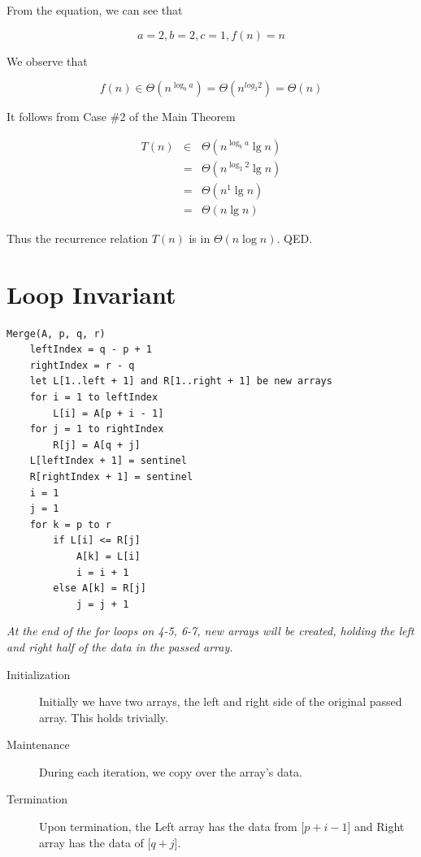 \documentclass{article}
\begin{document}
From the equation, we can see that

\begin{equation}
a = 2, b = 2, c = 1, f(n) = n
\end{equation}

We observe that

\begin{equation}
f(n) \in \Theta(n^{\log _b a}) = \Theta (n ^{log _2 2}) = \Theta(n)
\end{equation}

It follows from Case \#2 of the Main Theorem

\begin{eqnarray}
T(n) & \in & \Theta(n^{\log _b a} \lg n) \\
& = & \Theta (n^{\log _2 2} \lg n) \\
& = & \Theta (n^1 \lg n) \\
& = & \Theta (n \lg n)
\end{eqnarray}

Thus the recurrence relation $T(n)$ is in $\Theta (n \log n)$. QED.

\section{Loop Invariant}
\begin{Verbatim}
Merge(A, p, q, r)
    leftIndex = q - p + 1
    rightIndex = r - q
    let L[1..left + 1] and R[1..right + 1] be new arrays
    for i = 1 to leftIndex
        L[i] = A[p + i - 1]
    for j = 1 to rightIndex
        R[j] = A[q + j]
    L[leftIndex + 1] = sentinel
    R[rightIndex + 1] = sentinel
    i = 1
    j = 1
    for k = p to r
        if L[i] <= R[j]
            A[k] = L[i]
            i = i + 1
        else A[k] = R[j]
            j = j + 1
\end{Verbatim}

\noindent
\textit{At the end of the for loops on 4-5, 6-7, new arrays will be created, holding the left and right half of the data in the passed array.}
\begin{description}
\item [Initialization] Initially we have two arrays, the left and right side of the original passed array. This holds trivially.
\item [Maintenance] During each iteration, we copy over the array's data.
\item [Termination] Upon termination, the Left array has the data from [$p + i - 1$] and Right array has the data of [$q + j$].
\end{description}
\end{document}
